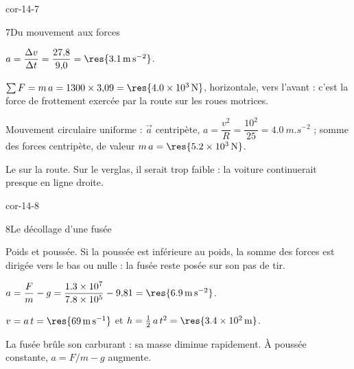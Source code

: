 \begin{blocLivre}{cor-14-7}
\begin{corrige}{7}{Du mouvement aux forces}
\begin{questions}
\item $a=\dfrac{\Delta v}{\Delta t}=\dfrac{27{,}8}{9{,}0}=\res{\qty{3,1}{m.s^{-2}}}$.
\item $\sum F=m\,a=1300\times3{,}09=\res{\qty{4,0e3}{N}}$, horizontale, vers l'avant : c'est la force de frottement exercée
par la route sur les roues motrices.
\item Mouvement circulaire uniforme : $\vec{a}$ centripète, $a=\dfrac{v^2}{R}=\dfrac{10^2}{25}=\qty{4,0}{m.s^{-2}}$ ; somme des
forces centripète, de valeur $m\,a=\res{\qty{5,2e3}{N}}$.
\item Le  sur la route. Sur le verglas, il serait trop faible : la voiture
continuerait presque en ligne droite.
\end{questions}
\end{corrige}
\end{blocLivre}
\begin{blocLivre}{cor-14-8}
\begin{corrige}{8}{Le décollage d'une fusée}
\begin{questions}
\item Poids et poussée. Si la poussée est inférieure au poids, la somme des forces est dirigée vers le bas ou nulle :
la fusée reste posée sur son pas de tir.
\item $a=\dfrac{F}{m}-g=\dfrac{\num{1.3e7}}{\num{7.8e5}}-9{,}81=\res{\qty{6,9}{m.s^{-2}}}$.
\item $v=a\,t=\res{\qty{69}{m.s^{-1}}}$ et $h=\frac12\,a\,t^2=\res{\qty{3,4e2}{m}}$.
\item La fusée brûle son carburant : sa masse diminue rapidement. À poussée constante, $a=F/m-g$ augmente.
\end{questions}
\end{corrige}
\end{blocLivre}
